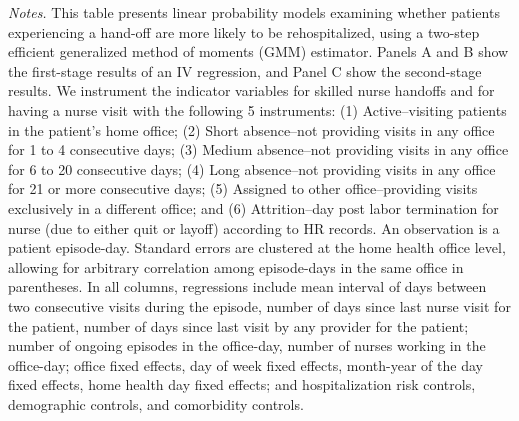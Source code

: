 \documentclass[final,12pt, notitlepage]{article}
\begin{document}
\begin{singlespace}
\begin{table}[H]
\begin{threeparttable}
{}
	\begin{tablenotes}
	\scriptsize
		\item \emph{Notes.} This table presents linear probability models examining whether patients experiencing a hand-off are more likely to be rehospitalized, using a two-step efficient generalized method of moments (GMM) estimator.
	Panels A and B show the first-stage results of an IV regression, and Panel C show the second-stage results.
	We instrument the indicator variables for skilled nurse handoffs and for having a nurse visit with the following 5 instruments:
(1) Active--visiting patients in the patient's home office;
(2) Short absence--not providing visits in any office for 1 to 4 consecutive days;
(3) Medium absence--not providing visits in any office for 6 to 20 consecutive days;
(4) Long absence--not providing visits in any office for 21 or more consecutive days;
(5) Assigned to other office--providing visits exclusively in a different office; and
(6) Attrition--day post labor termination for nurse (due to either quit or layoff) according to HR records.
	An observation is a patient episode-day.
	Standard errors are clustered at the home health office level, allowing for arbitrary correlation among episode-days in the same office in parentheses.
	In all columns, regressions include mean interval of days between two consecutive visits during the episode, number of days since last nurse visit for the patient, number of days since last visit by any provider for the patient; number of ongoing episodes in the office-day, number of nurses working in the office-day; office fixed effects, day of week fixed effects, month-year of the day fixed effects, home health day fixed effects; and hospitalization risk controls, demographic controls, and comorbidity controls.

\end{tablenotes}
\end{threeparttable}
\end{table}
\end{singlespace}
\end{document}
